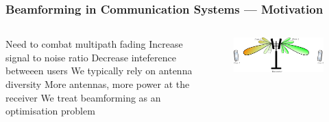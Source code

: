 \documentclass[10pt]{beamer}
\begin{document}
\begin{frame}
    \frametitle{Beamforming in Communication Systems — Motivation}
    \begin{columns}[T]
        \begin{column}[]{.6\textwidth}
            \begin{outline}
                \1 Need to combat multipath fading
                    \2 Increase signal to noise ratio
                    \2 Decrease inteference betweeen users
                \1 We typically rely on antenna diversity
                    \2 More antennas, more power at the receiver
                    \2 We treat beamforming as an optimisation problem
            \end{outline}            
        \end{column}
        \begin{column}{.4\textwidth}
            \begin{figure}[T!]
                \centering
                {\includegraphics[width=.95\textwidth]{MIMO.pdf}
                    \label{fig:beamforming}}
            \end{figure}
        \end{column}
    \end{columns}
\end{frame}
\end{document}
